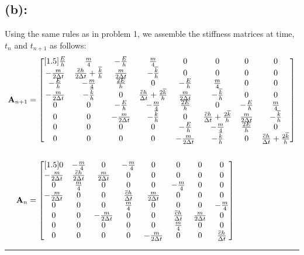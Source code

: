\subsection*{(b): }
Using the same rules as in problem 1, we assemble the stiffness matrices at time, $t_n$ and $t_{n+1}$ as follows: 
\begin{align*}
{\bf A}_{n+1}
& =
\begin{bmatrix}[1.5]
\frac{E}{h} & \frac{m}{4} & -\frac{E}{h} & \frac{m}{4} & 0 & 0 & 0 & 0\\
-\frac{m}{2\Delta t} & \frac{\overline{c}h}{2\Delta t}+ \frac{\overline{k}}{h} & \frac{m}{2\Delta t} & -\frac{\overline{k}}{h}  & 0 & 0 & 0 & 0\\
-\frac{E}{h} & -\frac{m}{4} & \frac{2E}{h} & 0 & -\frac{E}{h} & \frac{m}{4} & 0 & 0 \\
- \frac{m}{2\Delta t} & - \frac{\overline{k}}{h} & 0 & \frac{\overline{c}h}{\Delta t}+ \frac{2\overline{k}}{h} & \frac{m}{2\Delta t} & -\frac{\overline{k}}{h} & 0 & 0 \\
 0 & 0 & -\frac{E}{h} & -\frac{m}{4} & \frac{2E}{h} & 0 & -\frac{E}{h} & \frac{m}{4} \\
 0 & 0 &  - \frac{m}{2\Delta t} & - \frac{\overline{k}}{h} & 0 & \frac{\overline{c}h}{\Delta t}+ \frac{2\overline{k}}{h} & \frac{m}{2\Delta t } & - \frac{\overline{k}}{h} \\
 0 & 0 & 0 & 0 & -\frac{E}{h} & - \frac{m}{4} & \frac{2E}{h} & 0 \\
 0 & 0 & 0 & 0 & -\frac{m}{2\Delta t} & - \frac{\overline{k}}{h} & 0 & \frac{\overline{c}h}{\Delta t}+ \frac{2\overline{k}}{h}
\end{bmatrix} \\ \\
{\bf A}_n
& =
\begin{bmatrix}[1.5]
0 & -\frac{m}{4} & 0 & -\frac{m}{4} & 0 & 0 & 0 & 0 \\
-\frac{m}{2\Delta t} & \frac{\overline{c}h}{2\Delta t} & \frac{m}{2\Delta t} & 0 & 0 & 0 & 0 & 0\\
0 & \frac{m}{4} & 0 & 0 & 0 & -\frac{m}{4} & 0 & 0\\
- \frac{m}{2\Delta t} & 0 &  0 & \frac{\overline{c}h}{\Delta t} & \frac{m}{2\Delta t}& 0 & 0 & 0\\
0 & 0 & 0 & \frac{m}{4} & 0 & 0 &0 & -\frac{m}{4} \\
0 & 0 & -\frac{m}{2\Delta t }& 0 & 0 & \frac{\overline{c}h}{\Delta t} & \frac{m}{2\Delta t } & 0 \\
0 & 0 & 0 & 0 & 0 & \frac{m}{4} & 0 & 0 \\
0 & 0 & 0 & 0 & -\frac{m}{2\Delta t} & 0 & 0 & \frac{\overline{c}h}{\Delta t}
\end{bmatrix} 
\end{align*}\hrule
